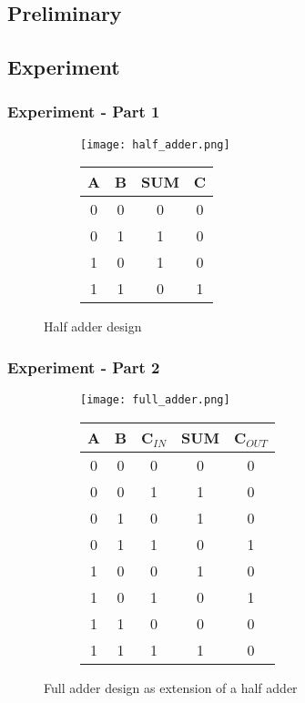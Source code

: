 \documentclass{article}
\begin{document}
\subsection{Preliminary}
\subsection{Experiment}

\subsubsection{Experiment - Part 1}
\begin{figure}[H]
\begin{subfigure}{0.5\textwidth}
	\centering
	\texttt{[image: half\_adder.png]}
\end{subfigure}%
\begin{subfigure}{0.5\textwidth}
\centering
\begin{tabular}{|c|c|c|c|}
\hline
A & B & SUM & C \\
\hline
0 & 0 & 0 & 0 \\
0 & 1 & 1 & 0 \\
1 & 0 & 1 & 0 \\
1 & 1 & 0 & 1 \\
\hline
\end{tabular}
\end{subfigure}
\caption{Half adder design}
\end{figure}


\subsubsection{Experiment - Part 2}
\begin{figure}[H]
\begin{subfigure}{0.7\textwidth}
\texttt{[image: full\_adder.png]}
\end{subfigure}%
\hspace{1em}%
\begin{subfigure}{0.2\textwidth}
\centering
\begin{tabular}{|c|c|c|c|c|}
\hline
A &	B & C$_{IN}$ & SUM & C$_{OUT}$ \\
\hline
0 & 0 & 0 & 0 & 0 \\
0 & 0 & 1 & 1 & 0 \\
0 & 1 & 0 & 1 & 0 \\
0 & 1 & 1 & 0 & 1 \\
1 & 0 & 0 & 1 & 0 \\
1 & 0 & 1 & 0 & 1 \\
1 & 1 & 0 & 0 & 0 \\
1 & 1 & 1 & 1 & 0 \\
\hline
\end{tabular}
\end{subfigure}
\caption{Full adder design as extension of a half adder}
\end{figure}
\end{document}
